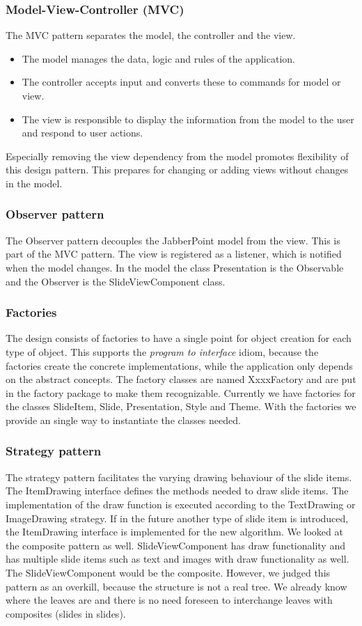 \documentclass[a4paper]{article}
\begin{document}
\subsubsection{Model-View-Controller (MVC)}
The MVC pattern separates the model, the controller and the view.   
\begin{itemize}
\item The model manages the data, logic and rules of the application.
\item The controller accepts input and converts these to commands for model or view.
\item The view is responsible to display the information from the model to the user and respond to user actions.   
\end{itemize}
Especially removing the view dependency from the model promotes flexibility of this design pattern. This prepares for changing or adding views without changes in the model.

\subsubsection{Observer pattern}
The Observer pattern decouples the JabberPoint model from the view. This is part of the MVC pattern. The view is registered as a listener, which is notified when the model changes. In the model the class Presentation is the Observable and the Observer is the SlideViewComponent class.

\subsubsection{Factories}
The design consists of factories to have a single point for object creation for each type of object. This supports the \textit{program to interface} idiom, because the factories create the concrete implementations, while the application only depends on the abstract concepts. The factory classes are named XxxxFactory and are put in the factory package to make them recognizable.
Currently we have factories for the classes SlideItem, Slide, Presentation, Style and Theme. With the factories we provide an single way to instantiate the classes needed.

\subsubsection{Strategy pattern}
The strategy pattern facilitates the varying drawing behaviour of the slide items. The ItemDrawing interface defines the methods needed to draw slide items. The implementation of the draw function is executed according to the TextDrawing or ImageDrawing strategy. If  in the future another type of slide item is introduced, the ItemDrawing interface is implemented for the new algorithm. We looked at the composite pattern as well. SlideViewComponent has draw functionality and has multiple slide items such as text and images with draw functionality as well. The SlideViewComponent would be the composite. However, we judged this pattern as an overkill, because the structure is not a real tree. We already know where the leaves are and there is no need foreseen to interchange leaves with composites (slides in slides).
\end{document}

